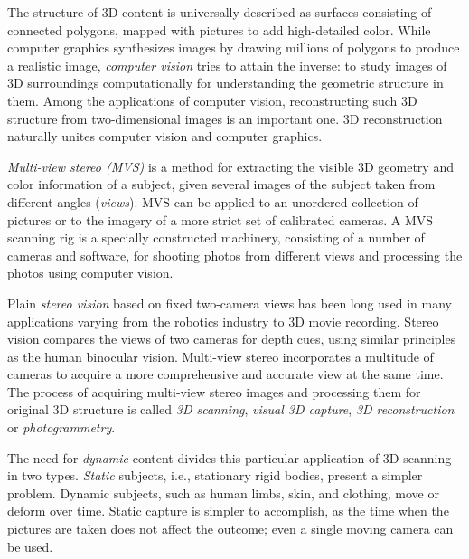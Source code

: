 The structure of 3D content is universally described as surfaces consisting of connected polygons, mapped with pictures to add high-detailed color.
While computer graphics synthesizes images by drawing millions of polygons to produce a realistic image, \emph{computer vision} tries to attain the inverse:
to study images of 3D surroundings computationally for understanding the geometric structure in them.
Among the applications of computer vision, reconstructing such 3D structure from two-dimensional images is an important one.
3D reconstruction naturally unites computer vision and computer graphics.


\emph{Multi-view stereo (MVS)} is a method for extracting the visible 3D geometry and color information of a subject, given several images of the subject taken from different angles (\emph{views}).
MVS can be applied to an unordered collection of pictures or to the imagery of a more strict set of calibrated cameras.
A MVS scanning rig is a specially constructed machinery, consisting of a number of cameras and software, for shooting photos from different views and processing the photos using computer vision.


Plain \emph{stereo vision} based on fixed two-camera views has been long used in many applications varying from the robotics industry to 3D movie recording.
Stereo vision compares the views of two cameras for depth cues, using similar principles as the human binocular vision.
Multi-view stereo incorporates a multitude of cameras to acquire a more comprehensive and accurate view at the same time.
The process of acquiring multi-view stereo images and processing them for original 3D structure is called \emph{3D scanning}, \emph{visual 3D capture}, \emph{3D reconstruction} or \emph{photogrammetry}.


The need for \emph{dynamic} content divides this particular application of 3D scanning in two types.
\emph{Static} subjects, i.e., stationary rigid bodies, present a simpler problem.
Dynamic subjects, such as human limbs, skin, and clothing, move or deform over time.
Static capture is simpler to accomplish, as the time when the pictures are taken does not affect the outcome; even a single moving camera can be used.


